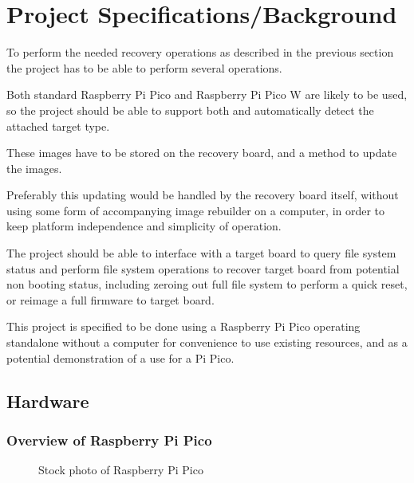 \clearpage%
\vspace{21.5pt}
\chapter{Project Specifications/Background}

To perform the needed recovery operations as described in the previous section the project has to be able to perform several operations.

Both standard Raspberry Pi Pico and Raspberry Pi Pico W are likely to be used, so the project should be able to support both and automatically detect the attached target type.

These images have to be stored  on the recovery board, and a method to update the images.

Preferably this updating would be handled by the recovery board itself, without using some form of accompanying image rebuilder on a computer, in order to keep platform independence and simplicity of operation.

The project should be able to interface with a target board to query file system status and perform file system operations to recover target board from potential non booting status, including zeroing out full file system to perform a quick reset, or reimage a full firmware to target board.

This project is specified to be done using a Raspberry Pi Pico operating standalone without a computer for convenience to use existing resources, and as a potential demonstration of a use for a Pi Pico.

\clearpage
\section{Hardware}

\subsection{Overview of Raspberry Pi Pico}

\begin{figure}[ht]
	\centering
	\caption{Stock photo of Raspberry Pi Pico\cite{ltdBuyRaspberryPi}}
	\label{fig:picostock}
\end{figure}

